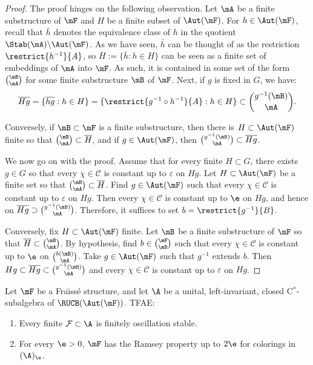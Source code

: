 \begin{proof}
The proof hinges on the following observation. Let $\mA$ be a finite substructure of $\mF$ and $H$ be a finite subset of $\Aut(\mF)$. For $h\in \Aut(\mF)$, recall that $\bar h$ denotes the equivalence class of $h$ in the quotient $\Stab(\mA)\backslash \Aut(\mF)$. As we have seen, $\bar h$ can be thought of as the restriction $\restrict{h^{-1}}{A}$, so $\overline H:=\{ \bar h:h\in H\}$ can be seen as a finite set of embeddings of $\mA$ into $\mF$. As such, it is contained in some set of the form $\binom{\mB}{\mA}$ for some finite substructure $\mB$ of $\mF$. Next, if $g$ is fixed in $G$, we have:
\[
\overline{Hg} = \{ \overline{hg}:h\in H\}=\{ \restrict{g^{-1}\circ h^{-1}}{A} : h\in H\} \subset \binom{g^{-1}(\mB)}{\mA}.
\]

Conversely, if $\mB \subset \mF$ is a finite substructure, then there is $H\subset \Aut(\mF)$ finite so that $\binom{\mB}{\mA}\subset \overline H$, and if $g\in \Aut(\mF)$, then $\binom{g^{-1}(\mB)}{\mA} \subset \overline{Hg}$.

We now go on with the proof. Assume that for every finite $H\subset G$, there exists $g\in G$ so that every $\chi \in \mathcal C$ is constant up to $\varepsilon$ on $Hg$. Let $H\subset \Aut(\mF)$ be a finite set so that $\binom{\mB}{\mA} \subset \overline H$. Find $g\in \Aut(\mF)$ such that every $\chi\in \mathcal C$ is constant up to $\varepsilon$ on $Hg$. Then every $\chi\in \mathcal C$ is constant up to $\e$ on $Hg$, and hence on $\overline{Hg}\supset \binom{g^{-1}(\mB)}{\mA}$. Therefore, it suffices to set $b=\restrict{g^{-1}}{B}$.

Conversely, fix $H\subset \Aut(\mF)$ finite. Let $\mB$ be a finite substructure of $\mF$ so that $\overline{H} \subset \binom{\mB}{\mA}$. By hypothesis, find $b\in \binom{\mF}{\mB}$ such that every $\chi\in \mathcal C$ is constant up to $\e$ on $\binom{b(\mB)}{\mA}$. Take $g\in \Aut(\mF)$ such that $g^{-1}$ extends $b$. Then $Hg\subset \overline{Hg}\subset \binom{g^{-1}(\mB)}{\mA}$ and every $\chi\in \mathcal C$ is constant up to $\varepsilon$ on $Hg$.
\end{proof}

\begin{prop}\label{prop:OSRP}
Let $\mF$ be a Fra\"{\i}ss\'e structure, and let $\A$ be a unital, left-invariant, closed C$^{*}$-subalgebra of $\RUCB(\Aut(\mF))$. TFAE:
\begin{enumerate}
\item \label{3.4.1} Every finite $\mathcal F\subset \A$ is finitely oscillation stable.
\item \label{3.4.2} For every $\e>0$, $\mF$ has the Ramsey property up to $2\e$ for colorings in $(\A)_{\e}$.
\end{enumerate}
\end{prop}

